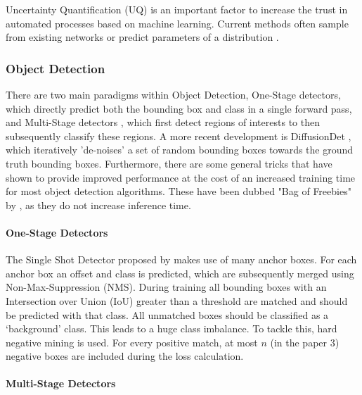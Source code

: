 Uncertainty Quantification (UQ) is an important factor to increase the trust in automated processes based on machine learning. Current methods often sample from existing networks \cite{gal2016dropout,NEURIPS2019_118921ef,miller2019evaluating} or predict parameters of a distribution \cite{choi2019gaussian,swiatkowski2020ktied}.


\subsubsection{Object Detection}\label{sec:broadliterature:object_detection}

There are two main paradigms within Object Detection, One-Stage detectors\cite{zhou2019objects, bochkovskiy2020yolov4, wang2022yolov7, liu2016ssd, duan2019centernet}, which directly predict both the bounding box and class in a single forward pass, and Multi-Stage detectors \cite{girshick2014rich, girshick2015fast}, which first detect regions of interests to then subsequently classify these regions. A more recent development is DiffusionDet \cite{chen2023diffusiondet}, which iteratively 'de-noises' a set of random bounding boxes towards the ground truth bounding boxes. Furthermore, there are some general tricks that have shown to provide improved performance at the cost of an increased training time for most object detection algorithms. These have been dubbed "Bag of Freebies" by \citep*{zhang2019bag}, as they do not increase inference time.

\paragraph*{One-Stage Detectors}
The Single Shot Detector proposed by \citep{liu2016ssd} makes use of many anchor boxes. For each anchor box an offset and class is predicted, which are subsequently merged using Non-Max-Suppression (NMS). During training all bounding boxes with an Intersection over Union (IoU) greater than a threshold are matched and should be predicted with that class. All unmatched boxes should be classified as a `background' class. This leads to a huge class imbalance. To tackle this, hard negative mining is used. For every positive match, at most $n$ (in the paper 3) negative boxes are included during the loss calculation.

\paragraph*{Multi-Stage Detectors}

